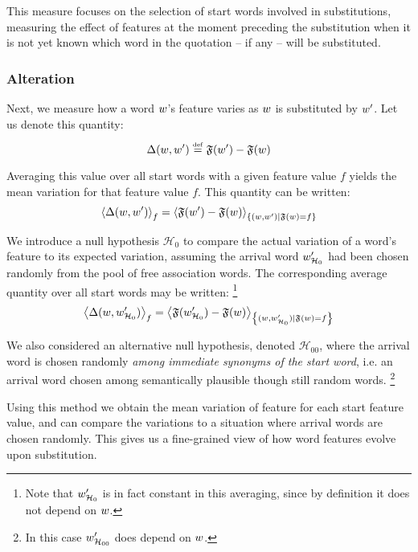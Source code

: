 This measure focuses on the selection of start words involved in substitutions, measuring the effect of features at the moment preceding the substitution when it is not yet known which word in the quotation -- if any -- will be substituted.

\subsubsection{Alteration}

Next, we measure how a word $w$'s feature varies as $w$ is substituted by $w'$.
Let us denote this quantity:
$$\Delta (w,w') \overset{\underset{\mathrm{def}}{}}{=} \mathfrak{F}(w') - \mathfrak{F}(w)$$

Averaging this value over all start words with a given feature value $f$ yields the mean variation for that feature value $f$.
This quantity can be written:
$$\left< \Delta(w,w') \right>_f = \left< \mathfrak{F}(w') - \mathfrak{F}(w) \right>_{\left\lbrace (w,w') | \mathfrak{F}(w) = f \right\rbrace}$$

We introduce a null hypothesis $\mathcal{H}_0$ to compare the actual variation of a word's feature to its expected variation, assuming the arrival word $w'_{\mathcal{H}_0}$ had been chosen randomly from the pool of free association words.
The corresponding average quantity over all start words may be written:
\footnote{Note that $w'_{\mathcal{H}_0}$ is in fact constant in this averaging, since by definition it does not depend on $w$.}
$$\left< \Delta(w,w'_{\mathcal{H}_0}) \right>_f = \left< \mathfrak{F}({w'_{\mathcal{H}_0}}) - \mathfrak{F}(w) \right>_{\left\lbrace (w,w'_{\mathcal{H}_0}) | \mathfrak{F}(w) = f \right\rbrace}$$

We also considered an alternative null hypothesis, denoted $\mathcal{H}_{00}$, where the arrival word is chosen randomly \emph{among immediate synonyms of the start word}, i.e. an arrival word chosen among semantically plausible though still random words.
\footnote{In this case $w'_{\mathcal{H}_{00}}$ does depend on $w$.} 

Using this method we obtain the mean variation of feature for each start feature value, and can compare the variations to a situation where arrival words are chosen randomly.
This gives us a fine-grained view of how word features evolve upon substitution.
